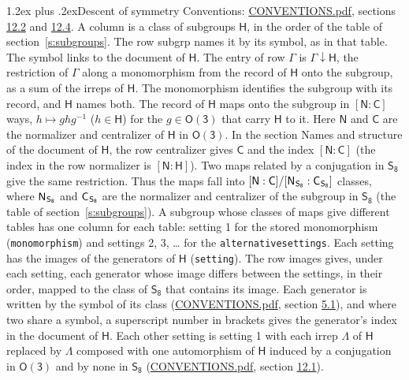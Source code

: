 \documentclass[10pt,a4paper]{article}
\makeatletter
\renewcommand\section{\@startsection{section}{1}{\z@}{-3ex plus -1ex minus -.2ex}%
  {1.2ex plus .2ex}{\normalfont\large\sffamily\bfseries\color{parttitle}}}
\numberwithin{equation}{section}
\newcommand{\grp}[1]{\mathsf{#1}}
\newcommand{\grpindex}[2]{[#1 : #2]}
\newcommand{\restr}[2]{#1\!\downarrow#2}
\newcommand{\hairsp}{\mkern1mu}
\makeatother
\begin{document}
\section{Descent of symmetry}\label{s:subduction}
Conventions: \href{../../CONVENTIONS.pdf}{CONVENTIONS.pdf}, sections \href{../../CONVENTIONS.pdf\#conv.12.2}{12.2} and \href{../../CONVENTIONS.pdf\#conv.12.4}{12.4}.
A column is a class of subgroups $\grp{H}$, in the order of the table of section~\ref{s:subgroups}. The row subgrp names it by its symbol, as in that table. The symbol links to the document of $\grp{H}$. The entry of row $\Gamma$ is $\restr{\Gamma}{\grp{H}}$, the restriction of $\Gamma$ along a monomorphism from the record of $\grp{H}$ onto the subgroup, as a sum of the irreps of $\grp{H}$. The monomorphism identifies the subgroup with its record, and $\grp{H}$ names both. \label{n:group.normalizer.o3}\label{n:group.centralizer.o3}The record of $\grp{H}$ maps onto the subgroup in $\grpindex{\grp{N}}{\grp{C}}$ ways, $h \mapsto g h g^{-1}$ ($h \in \grp{H}$) for the $g \in \grp{O(3)}$ that carry $\grp{H}$ to it. Here $\grp{N}$ and $\grp{C}$ are the normalizer and centralizer of $\grp{H}$ in \href{O3.pdf}{$\grp{O(3)}$}. In the section Names and structure of the document of $\grp{H}$, the row centralizer gives $\grp{C}$ and the index $\grpindex{\grp{N}}{\grp{C}}$ (the index in the row normalizer is $\grpindex{\grp{N}}{\grp{H}}$). Two maps related by a conjugation in $\grp{S_{8}}$ give the same restriction. Thus the maps fall into $\grpindex{\grp{N}}{\grp{C}}/\grpindex{\grp{N}_{\hairsp \grp{S_{8}}}}{\grp{C}_{\hairsp \grp{S_{8}}}}$ classes, where $\grp{N}_{\hairsp \grp{S_{8}}}$ and $\grp{C}_{\hairsp \grp{S_{8}}}$ are the normalizer and centralizer of the subgroup in $\grp{S_{8}}$ (the table of section~\ref{s:subgroups}). \label{n:head.setting}A subgroup whose classes of maps give different tables has one column for each table: setting 1 for the stored monomorphism (\texttt{monomorphism}) and settings 2, 3, \dots{} for the \texttt{alternativesettings}. Each setting has the images of the generators of $\grp{H}$ (\texttt{setting}). \label{n:head.images}The row images gives, under each setting, each generator whose image differs between the settings, in their order, mapped to the class of $\grp{S_{8}}$ that contains its image. Each generator is written by the symbol of its class (\href{../../CONVENTIONS.pdf}{CONVENTIONS.pdf}, section \href{../../CONVENTIONS.pdf\#conv.5.1}{5.1}), and where two share a symbol, a superscript number in brackets gives the generator's index in the document of $\grp{H}$. \label{n:irrep.Delta}Each other setting is setting 1 with each irrep $\Lambda$ of $\grp{H}$ replaced by $\Lambda$ composed with one automorphism of $\grp{H}$ induced by a conjugation in \href{O3.pdf}{$\grp{O(3)}$} and by none in $\grp{S_{8}}$ (\href{../../CONVENTIONS.pdf}{CONVENTIONS.pdf}, section \href{../../CONVENTIONS.pdf\#conv.12.1}{12.1}).
\end{document}
